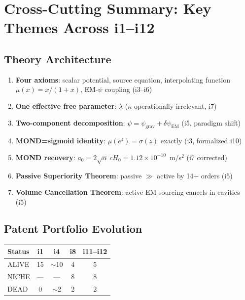 \documentclass[11pt,a4paper]{article}
\begin{document}
\section{Cross-Cutting Summary: Key Themes Across i1--i12}

\subsection{Theory Architecture}

\begin{enumerate}[nosep]
\item \textbf{Four axioms}: scalar potential, source equation, interpolating function $\mu(x)=x/(1+x)$, EM-$\psi$ coupling (i3--i6)
\item \textbf{One effective free parameter}: $\lambda$ ($\kappa$ operationally irrelevant, i7)
\item \textbf{Two-component decomposition}: $\psi=\psi_\mathrm{grav}+\delta\psi_\mathrm{EM}$ (i5, paradigm shift)
\item \textbf{MOND=sigmoid identity}: $\mu(e^z)=\sigma(z)$ exactly (i3, formalized i10)
\item \textbf{MOND recovery}: $a_0=2\sqrt{\alpha}\,cH_0=1.12\times10^{-10}$~m/s$^2$ (i7 corrected)
\item \textbf{Passive Superiority Theorem}: passive $\gg$ active by 14+ orders (i5)
\item \textbf{Volume Cancellation Theorem}: active EM sourcing cancels in cavities (i5)
\end{enumerate}

\subsection{Patent Portfolio Evolution}

\begin{center}
\begin{tabular}{lcccc}
\toprule
\textbf{Status} & \textbf{i1} & \textbf{i4} & \textbf{i8} & \textbf{i11--i12} \\
\midrule
ALIVE & 15 & $\sim$10 & 4 & 5 \\
NICHE & --- & --- & 8 & 8 \\
DEAD & 0 & $\sim$2 & 2 & 2 \\
\bottomrule
\end{tabular}
\end{center}
\end{document}

